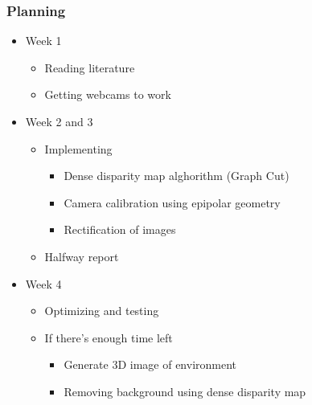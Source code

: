 \documentclass{beamer}
\begin{document}
\frame
{
  \frametitle{Planning}
  \begin{itemize}

    \item Week 1
      \begin{itemize}
        \item Reading literature
        \item Getting webcams to work
      \end{itemize}
    \item Week 2 and 3
      \begin{itemize}
        \item Implementing
          \begin{itemize}
            \item Dense disparity map alghorithm (Graph Cut)
            \item Camera calibration using epipolar geometry
            \item Rectification of images
          \end{itemize}
        \item Halfway report
      \end{itemize}
    \item Week 4
      \begin{itemize}
        \item Optimizing and testing
        \item If there's enough time left
          \begin{itemize}
            \item Generate 3D image of environment
            \item Removing background using dense disparity map
          \end{itemize}
      \end{itemize}
  \end{itemize}
}
\end{document}

